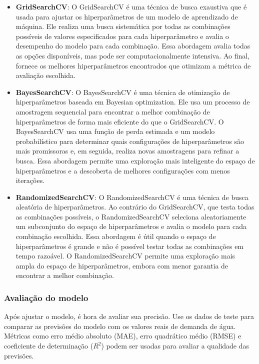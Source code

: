 \begin{itemize}
	\item \textbf{GridSearchCV}: O GridSearchCV é uma técnica de busca exaustiva que é usada para ajustar os hiperparâmetros de um modelo de aprendizado de máquina. Ele realiza uma busca sistemática por todas as combinações possíveis de valores especificados para cada hiperparâmetro e avalia o desempenho do modelo para cada combinação. Essa abordagem avalia todas as opções disponíveis, mas pode ser computacionalmente intensiva. Ao final, fornece os melhores hiperparâmetros encontrados que otimizam a métrica de avaliação escolhida.

\item \textbf{BayesSearchCV}: O BayesSearchCV é uma técnica de otimização de hiperparâmetros baseada em Bayesian optimization. Ele usa um processo de amostragem sequencial para encontrar a melhor combinação de hiperparâmetros de forma mais eficiente do que o GridSearchCV. O BayesSearchCV usa uma função de perda estimada e um modelo probabilístico para determinar quais configurações de hiperparâmetros são mais promissoras e, em seguida, realiza novas amostragens para refinar a busca. Essa abordagem permite uma exploração mais inteligente do espaço de hiperparâmetros e a descoberta de melhores configurações com menos iterações.

\item \textbf{RandomizedSearchCV}: O RandomizedSearchCV é uma técnica de busca aleatória de hiperparâmetros. Ao contrário do GridSearchCV, que testa todas as combinações possíveis, o RandomizedSearchCV seleciona aleatoriamente um subconjunto do espaço de hiperparâmetros e avalia o modelo para cada combinação escolhida. Essa abordagem é útil quando o espaço de hiperparâmetros é grande e não é possível testar todas as combinações em tempo razoável. O RandomizedSearchCV permite uma exploração mais ampla do espaço de hiperparâmetros, embora com menor garantia de encontrar a melhor combinação.
\end{itemize}

\subsubsection{Avalia\c c\~ao do modelo}

Após ajustar o modelo, é hora de avaliar sua precisão. Use os dados de teste para comparar as previsões do modelo com os valores reais de demanda de água. Métricas como erro médio absoluto (MAE), erro quadrático médio (RMSE) e coeficiente de determinação ($R^2$) podem ser usadas para avaliar a qualidade das previsões.

